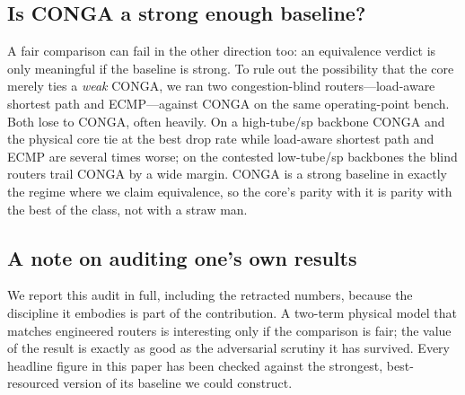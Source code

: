 \subsection{Is CONGA a strong enough baseline?}
\label{sec:baseline-fairness}

A fair comparison can fail in the other direction too: an equivalence verdict is
only meaningful if the baseline is strong. To rule out the possibility that the
core merely ties a \emph{weak} CONGA, we ran two congestion-blind routers---load-aware
shortest path and ECMP---against CONGA on the same operating-point bench. Both lose
to CONGA, often heavily. On a high-tube/sp backbone CONGA and the physical core tie
at the best drop rate while load-aware shortest path and ECMP are several times
worse; on the contested low-tube/sp backbones the blind routers trail CONGA by a
wide margin. CONGA is a strong baseline in exactly the regime where we claim
equivalence, so the core's parity with it is parity with the best of the class, not
with a straw man.

\subsection{A note on auditing one's own results}

We report this audit in full, including the retracted numbers, because the
discipline it embodies is part of the contribution. A two-term physical model
that matches engineered routers is interesting only if the comparison is fair;
the value of the result is exactly as good as the adversarial scrutiny it has
survived. Every headline figure in this paper has been checked against the
strongest, best-resourced version of its baseline we could construct.

